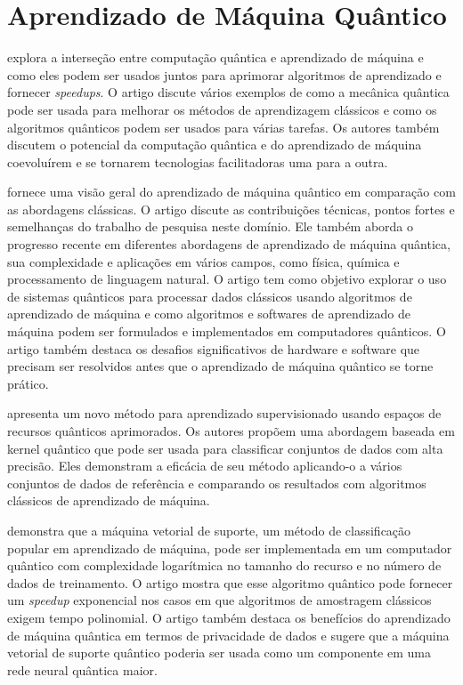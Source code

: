 \section{Aprendizado de Máquina Quântico}

 explora a interseção entre computação quântica e aprendizado de máquina e como eles podem ser usados juntos para aprimorar algoritmos de aprendizado e fornecer \textit{speedups}. O artigo discute vários exemplos de como a mecânica quântica pode ser usada para melhorar os métodos de aprendizagem clássicos e como os algoritmos quânticos podem ser usados para várias tarefas. Os autores também discutem o potencial da computação quântica e do aprendizado de máquina coevoluírem e se tornarem tecnologias facilitadoras uma para a outra.

 fornece uma visão geral do aprendizado de máquina quântico em comparação com as abordagens clássicas. O artigo discute as contribuições técnicas, pontos fortes e semelhanças do trabalho de pesquisa neste domínio. Ele também aborda o progresso recente em diferentes abordagens de aprendizado de máquina quântica, sua complexidade e aplicações em vários campos, como física, química e processamento de linguagem natural. O artigo tem como objetivo explorar o uso de sistemas quânticos para processar dados clássicos usando algoritmos de aprendizado de máquina e como algoritmos e softwares de aprendizado de máquina podem ser formulados e implementados em computadores quânticos. O artigo também destaca os desafios significativos de hardware e software que precisam ser resolvidos antes que o aprendizado de máquina quântico se torne prático.

 apresenta um novo método para aprendizado supervisionado usando espaços de recursos quânticos aprimorados. Os autores propõem uma abordagem baseada em kernel quântico que pode ser usada para classificar conjuntos de dados com alta precisão. Eles demonstram a eficácia de seu método aplicando-o a vários conjuntos de dados de referência e comparando os resultados com algoritmos clássicos de aprendizado de máquina.

 demonstra que a máquina vetorial de suporte, um método de classificação popular em aprendizado de máquina, pode ser implementada em um computador quântico com complexidade logarítmica no tamanho do recurso e no número de dados de treinamento. O artigo mostra que esse algoritmo quântico pode fornecer um \textit{speedup} exponencial nos casos em que algoritmos de amostragem clássicos exigem tempo polinomial. O artigo também destaca os benefícios do aprendizado de máquina quântica em termos de privacidade de dados e sugere que a máquina vetorial de suporte quântico poderia ser usada como um componente em uma rede neural quântica maior.


